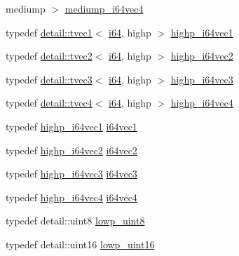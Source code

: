 \begin{DoxyCompactItemize}
mediump $>$ \hyperlink{group__gtc__type__precision_gab4db11ebb425fa18fe5d15d455c360a3}{mediump\-\_\-i64vec4}
\item 
typedef \hyperlink{structglm_1_1detail_1_1tvec1}{detail\-::tvec1}$<$ \hyperlink{group__gtc__type__precision_gac7a7eaad46064fc952b06df33689da23}{i64}, highp $>$ \hyperlink{group__gtc__type__precision_ga06c21aba992669f5c160ec5f5a480522}{highp\-\_\-i64vec1}
\item 
typedef \hyperlink{structglm_1_1detail_1_1tvec2}{detail\-::tvec2}$<$ \hyperlink{group__gtc__type__precision_gac7a7eaad46064fc952b06df33689da23}{i64}, highp $>$ \hyperlink{group__gtc__type__precision_gabfe3aa6fa4003a47577beb9678ab2661}{highp\-\_\-i64vec2}
\item 
typedef \hyperlink{structglm_1_1detail_1_1tvec3}{detail\-::tvec3}$<$ \hyperlink{group__gtc__type__precision_gac7a7eaad46064fc952b06df33689da23}{i64}, highp $>$ \hyperlink{group__gtc__type__precision_ga4030f8ad15da56f5e427aa457d39e888}{highp\-\_\-i64vec3}
\item 
typedef \hyperlink{structglm_1_1detail_1_1tvec4}{detail\-::tvec4}$<$ \hyperlink{group__gtc__type__precision_gac7a7eaad46064fc952b06df33689da23}{i64}, highp $>$ \hyperlink{group__gtc__type__precision_ga0ea279cd954fbb71a1db62e897d4d7f5}{highp\-\_\-i64vec4}
\item 
typedef \hyperlink{group__gtc__type__precision_ga06c21aba992669f5c160ec5f5a480522}{highp\-\_\-i64vec1} \hyperlink{group__gtc__type__precision_ga8bc234da7e4a6436e01241f439fc7ddd}{i64vec1}
\item 
typedef \hyperlink{group__gtc__type__precision_gabfe3aa6fa4003a47577beb9678ab2661}{highp\-\_\-i64vec2} \hyperlink{group__gtc__type__precision_ga75461c98baf3e3913566550bd9d8d17f}{i64vec2}
\item 
typedef \hyperlink{group__gtc__type__precision_ga4030f8ad15da56f5e427aa457d39e888}{highp\-\_\-i64vec3} \hyperlink{group__gtc__type__precision_gab6eefcd7eb24e4142ed23dc1e87163a6}{i64vec3}
\item 
typedef \hyperlink{group__gtc__type__precision_ga0ea279cd954fbb71a1db62e897d4d7f5}{highp\-\_\-i64vec4} \hyperlink{group__gtc__type__precision_ga19846034cab6ee6e031884ea30def7fc}{i64vec4}
\item 
typedef detail\-::uint8 \hyperlink{group__gtc__type__precision_ga4d9dc08b7b248a386dfe9afd00fc6b1e}{lowp\-\_\-uint8}
\item 
typedef detail\-::uint16 \hyperlink{group__gtc__type__precision_ga9b8409887319f62f06e664f6ca121b9d}{lowp\-\_\-uint16}
\item 

\end{DoxyCompactItemize}
